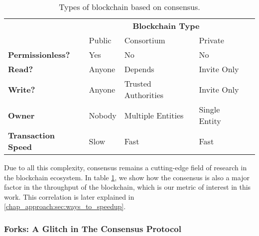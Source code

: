 \begin{table}[ht]
\centering
	\caption{Types of blockchain based on consensus.}
	\label{table:blockchain_types}
	\begin{tabular}{lllll}
													& \multicolumn{3}{c}{\textbf{Blockchain Type}} &
													\\
													& Public & Consortium          & Private       &
	\\ \cline{1-4} \multicolumn{1}{l|}{\textbf{Permissionless?}}   & Yes    & No                  &
	No            &  \\
	\multicolumn{1}{l|}{\textbf{Read?}}             & Anyone & Depends             & Invite Only   &
	\\
	\multicolumn{1}{l|}{\textbf{Write?}}            & Anyone & Trusted Authorities & Invite Only   &
	\\
	\multicolumn{1}{l|}{\textbf{Owner}}             & Nobody & Multiple Entities   & Single Entity &
	\\
	\multicolumn{1}{l|}{\textbf{Transaction Speed}} & Slow   & Fast                & Fast          &
	\\ \hline
	\end{tabular}
\end{table}

Due to all this complexity, consensus remains a cutting-edge field of research in the blockchain
ecosystem. In table \ref{table:blockchain_types}, we show how the consensus is also a major factor
in the throughput of the blockchain, which is our metric of interest in this work. This correlation
is later explained in \ref{chap_approach:sec:ways_to_speedup}.

\subsubsection{Forks: A Glitch in The Consensus Protocol}


